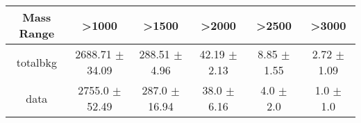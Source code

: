 \begin{footnotesize} 
\begin{tabular}{c|c|c|c|c|c} 
Mass Range & >1000 & >1500 & >2000 & >2500 & >3000 \\ 
\hline\hline 
totalbkg & 2688.71 $\pm$ 34.09 & 288.51 $\pm$ 4.96 & 42.19 $\pm$ 2.13 & 8.85 $\pm$ 1.55 & 2.72 $\pm$ 1.09\\ 
data & 2755.0 $\pm$ 52.49 & 287.0 $\pm$ 16.94 & 38.0 $\pm$ 6.16 & 4.0 $\pm$ 2.0 & 1.0 $\pm$ 1.0\\ 
\hline\hline 
\end{tabular} 
\end{footnotesize} 
\newline 
